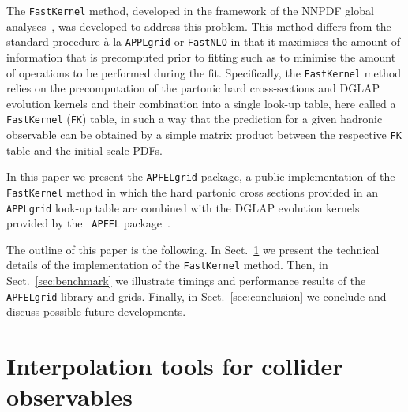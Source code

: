 \documentclass[preprint,12pt]{elsarticle}
\begin{document}
The {\tt FastKernel} method, developed in the framework of the NNPDF
global analyses~\cite{Ball:2010de,Ball:2014uwa}, was developed to
address this problem. This method differs from the standard procedure
\`{a} la {\tt APPLgrid} or {\tt FastNLO} in that it maximises the
amount of information that is precomputed prior to fitting such as to
minimise the amount of operations to be performed during the
fit. Specifically, the {\tt FastKernel} method relies on the
precomputation of the partonic hard cross-sections and DGLAP evolution
kernels and their combination into a single look-up table, here called
a {\tt FastKernel} ({\tt FK}) table, in such a way that the prediction
for a given hadronic observable can be obtained by a simple matrix
product between the respective {\tt FK} table and the initial scale
PDFs.

In this paper we present the {\tt APFELgrid} package, a public
implementation of the {\tt FastKernel} method in which the hard
partonic cross sections provided in an {\tt APPLgrid} look-up table
are combined with the DGLAP evolution kernels provided by the {\tt
  APFEL}
package~\cite{Bertone:2013vaa,Carrazza:2014gfa,Bertone:2015cwa,Bertone:2015lqa,Carrazza:2015dea,Bertone:2015gba}.

The outline of this paper is the following. In
Sect.~\ref{sec:FastKernel} we present the technical details of the
implementation of the {\tt FastKernel} method. Then, in
Sect.~\ref{sec:benchmark} we illustrate timings and performance
results of the {\tt APFELgrid} library and grids. Finally, in
Sect.~\ref{sec:conclusion} we conclude and discuss possible future
developments.

\section{Interpolation tools for collider observables}\label{sec:FastKernel}
\end{document}
